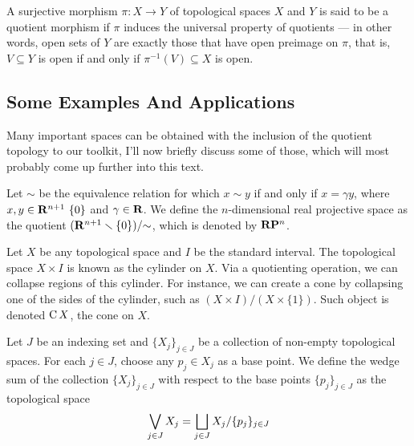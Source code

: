 \begin{definition}
\label{def:quotient-morphism}
A surjective morphism \(\pi: X \to Y\) of topological spaces \(X\) and \(Y\) is
said to be a quotient morphism if \(\pi\) induces the universal property of
quotients --- in other words, open sets of \(Y\) are exactly those that have
open preimage on \(\pi\), that is, \(V \subseteq Y\) is open if and only if
\(\pi^{-1}(V) \subseteq X\) is open.
\end{definition}

\subsection{Some Examples And Applications}

Many important spaces can be obtained with the inclusion of the quotient
topology to our toolkit, I'll now briefly discuss some of those, which will most
probably come up further into this text.

\begin{example}\label{exp:real-projective-space}
Let \(\sim\) be the equivalence relation for which \(x \sim y\) if and only if
\(x = \gamma y\), where \(x, y \in \mathbf{R}^{n+1} \ \{0\}\) and \(\gamma \in \mathbf{R}\). We
define the \(n\)-dimensional real projective space as the quotient \((\mathbf{R}^{n+1}
\smallsetminus \{0\})/{\sim}\), which is denoted by \(\mathbf{R} \mathbf{P}^{n}\).
\end{example}

\begin{example}[Cone]\label{exp:cone}
Let \(X\) be any topological space and \(I\) be the standard interval. The
topological space \(X \times I\) is known as the cylinder on \(X\). Via a
quotienting operation, we can collapse regions of this cylinder. For instance,
we can create a cone by collapsing one of the sides of the cylinder, such as
\((X \times I) / (X \times \{1\})\). Such object is denoted \(\operatorname{C} X\), the
cone on \(X\).
\end{example}

\begin{example}
\label{exp:wedge-sum-space}
Let \(J\) be an indexing set and \(\{X_j\}_{j \in J}\) be a collection of
non-empty topological spaces. For each \(j \in J\), choose any \(p_j \in X_j\)
as a base point. We define the wedge sum of the collection \(\{X_{j}\}_{j \in
J}\) with respect to the base points \(\{p_{j}\}_{j \in J}\) as the topological
space
\[
  \bigvee_{j \in J} X_j = \bigsqcup_{j \in J} X_j / \{p_{j}\}_{j \in J}
\]
\end{example}

